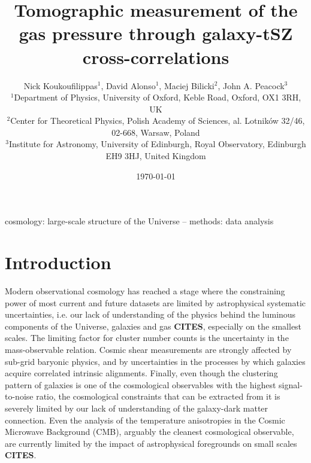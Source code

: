 \documentclass[useAMS,usenatbib]{mn2e}
\title[Tomographic measurement of the gas pressure through galaxy-tSZ cross-correlations]{Tomographic measurement of the gas pressure through galaxy-tSZ cross-correlations}
\author[David Alonso]{Nick Koukoufilippas$^1$, David Alonso$^1$, Maciej Bilicki$^2$, John A. Peacock$^3$\\
                      $^{1}$Department of Physics, University of Oxford, Keble Road, Oxford, OX1 3RH, UK\\
                      $^{2}$Center for Theoretical Physics, Polish Academy of Sciences, al. Lotnik\'ow 32/46, 02-668, Warsaw, Poland\\
                      $^{3}$Institute for Astronomy, University of Edinburgh, Royal Observatory, Edinburgh EH9 3HJ, United Kingdom
                      }
\newcommand{\cites}{{\bf CITES}}
\begin{document}
  \date{\today}
   
  \maketitle

\begin{abstract}
  \lipsum[1]
\end{abstract}

\begin{keywords}
  cosmology: large-scale structure of the Universe -- methods: data analysis
\end{keywords}

\section{Introduction}\label{sec:intro}
  Modern observational cosmology has reached a stage where the constraining power of most current and future datasets are limited by astrophysical systematic uncertainties, i.e. our lack of understanding of the physics behind the luminous components of the Universe, galaxies and gas \cites, especially on the smallest scales. The limiting factor for cluster number counts is the uncertainty in the mass-observable relation. Cosmic shear measurements are strongly affected by sub-grid baryonic physics, and by uncertainties in the processes by which galaxies acquire correlated intrinsic alignments. Finally, even though the clustering pattern of galaxies is one of the cosmological observables with the highest signal-to-noise ratio, the cosmological constraints that can be extracted from it is severely limited by our lack of understanding of the galaxy-dark matter connection. Even the analysis of the temperature anisotropies in the Cosmic Microwave Background (CMB), arguably the cleanest cosmological observable, are currently limited by the impact of astrophysical foregrounds on small scales \cites.
  
\end{document}
